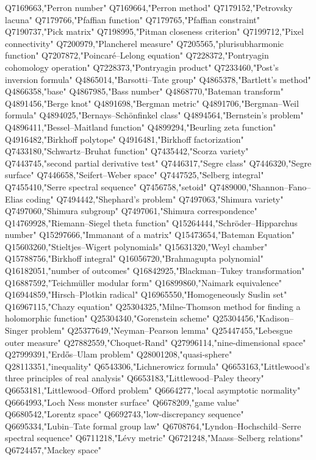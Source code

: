 Q7169663,"Perron number"
Q7169664,"Perron method"
Q7179152,"Petrovsky lacuna"
Q7179766,"Pfaffian function"
Q7179765,"Pfaffian constraint"
Q7190737,"Pick matrix"
Q7198995,"Pitman closeness criterion"
Q7199712,"Pixel connectivity"
Q7200979,"Plancherel measure"
Q7205565,"plurisubharmonic function"
Q7207872,"Poincaré–Lelong equation"
Q7228372,"Pontryagin cohomology operation"
Q7228373,"Pontryagin product"
Q7233460,"Post's inversion formula"
Q4865014,"Barsotti–Tate group"
Q4865378,"Bartlett's method"
Q4866358,"base"
Q4867985,"Bass number"
Q4868770,"Bateman transform"
Q4891456,"Berge knot"
Q4891698,"Bergman metric"
Q4891706,"Bergman–Weil formula"
Q4894025,"Bernays–Schönfinkel class"
Q4894564,"Bernstein's problem"
Q4896411,"Bessel–Maitland function"
Q4899294,"Beurling zeta function"
Q4916482,"Birkhoff polytope"
Q4916481,"Birkhoff factorization"
Q7433180,"Schwartz–Bruhat function"
Q7435442,"Scorza variety"
Q7443745,"second partial derivative test"
Q7446317,"Segre class"
Q7446320,"Segre surface"
Q7446658,"Seifert–Weber space"
Q7447525,"Selberg integral"
Q7455410,"Serre spectral sequence"
Q7456758,"setoid"
Q7489000,"Shannon–Fano–Elias coding"
Q7494442,"Shephard's problem"
Q7497063,"Shimura variety"
Q7497060,"Shimura subgroup"
Q7497061,"Shimura correspondence"
Q14769928,"Riemann–Siegel theta function"
Q15264444,"Schröder–Hipparchus number"
Q15297666,"Immanant of a matrix"
Q15473654,"Bateman Equation"
Q15603260,"Stieltjes–Wigert polynomials"
Q15631320,"Weyl chamber"
Q15788756,"Birkhoff integral"
Q16056720,"Brahmagupta polynomial"
Q16182051,"number of outcomes"
Q16842925,"Blackman–Tukey transformation"
Q16887592,"Teichmüller modular form"
Q16899860,"Naimark equivalence"
Q16944859,"Hirsch–Plotkin radical"
Q16965550,"Homogeneously Suslin set"
Q16967115,"Chazy equation"
Q25304325,"Milne-Thomson method for finding a holomorphic function"
Q25304340,"Gorenstein scheme"
Q25304456,"Kadison–Singer problem"
Q25377649,"Neyman–Pearson lemma"
Q25447455,"Lebesgue outer measure"
Q27882559,"Choquet-Rand"
Q27996114,"nine-dimensional space"
Q27999391,"Erdős–Ulam problem"
Q28001208,"quasi-sphere"
Q28113351,"inequality"
Q6543306,"Lichnerowicz formula"
Q6653163,"Littlewood's three principles of real analysis"
Q6653183,"Littlewood–Paley theory"
Q6653181,"Littlewood–Offord problem"
Q6664277,"local asymptotic normality"
Q6664993,"Loch Ness monster surface"
Q6678209,"game value"
Q6680542,"Lorentz space"
Q6692743,"low-discrepancy sequence"
Q6695334,"Lubin–Tate formal group law"
Q6708764,"Lyndon–Hochschild–Serre spectral sequence"
Q6711218,"Lévy metric"
Q6721248,"Maass–Selberg relations"
Q6724457,"Mackey space"
